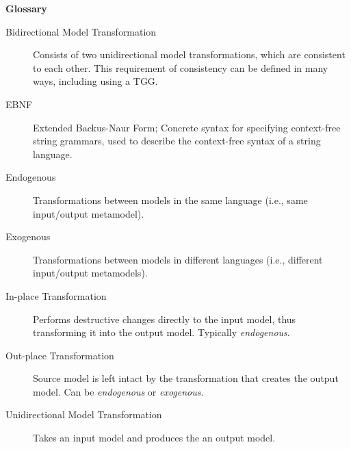 \newpage
{}
{}
\hypertarget{glossary}{}

\vspace{1cm}
{\Huge \bf Glossary}
\vspace{1cm}

\begin{description}

\item[Bidirectional Model Transformation]  Consists of two unidirectional model transformations, which are consistent to each other. This requirement of
consistency can be defined in many ways, including using a TGG.

\item[EBNF] Extended Backus-Naur Form; Concrete syntax for specifying context-free string grammars, used to describe the context-free syntax of a
string language.

\item[Endogenous] Transformations between models in the same language (i.e., same input/output metamodel). 
 
\item[Exogenous] Transformations between models in different languages (i.e., different input/output metamodels). 

\item[In-place Transformation] Performs destructive changes directly to the input model, thus transforming it into the output model. Typically
\emph{endogenous}.

\item[Out-place Transformation] Source model is left intact by the transformation that creates the output model. Can be \emph{endogenous} or \emph{exogenous}.

\item[Unidirectional Model Transformation] Takes an input model and produces the an output model.

\end{description}
